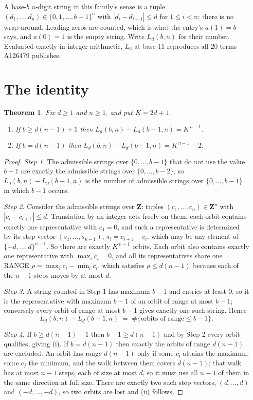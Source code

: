 \documentclass[11pt,a4paper]{article}
\theoremstyle{plain}
\newtheorem{theorem}{Theorem}
\theoremstyle{definition}
\begin{document}
A base-$b$ $n$-digit string in this family's sense is a tuple
$(d_1,\dots,d_n)\in\{0,1,\dots,b-1\}^{n}$ with $|d_i-d_{i+1}|\le d$ for $1\le i<n$; there
is no wrap-around. Leading zeros are counted, which is what the entry's $a(1)=b$ says, and
$a(0)=1$ is the empty string. Write $L_d(b,n)$ for their number. Evaluated exactly in integer
arithmetic, $L_{3}$ at base $11$ reproduces all $20$ terms A126479 publishes.

\section{The identity}

\begin{theorem}
Fix $d\ge1$ and $n\ge1$, and put $K=2d+1$.
\begin{enumerate}
\item[(i)] If $b\ge d(n-1)+1$ then $L_d(b,n)-L_d(b-1,n)=K^{\,n-1}$.
\item[(ii)] If $b=d(n-1)$ then $L_d(b,n)-L_d(b-1,n)=K^{\,n-1}-2$.
\end{enumerate}
\end{theorem}

\begin{proof}
\emph{Step 1.} The admissible strings over $\{0,\dots,b-1\}$ that do not use the value $b-1$
are exactly the admissible strings over $\{0,\dots,b-2\}$, so $L_d(b,n)-L_d(b-1,n)$ is the
number of admissible strings over $\{0,\dots,b-1\}$ in which $b-1$ occurs.

\emph{Step 2.} Consider the admissible strings over $\mathbf{Z}$: tuples
$(c_1,\dots,c_n)\in\mathbf{Z}^{n}$ with $|c_i-c_{i+1}|\le d$. Translation by an integer acts
freely on them, each orbit contains exactly one representative with $c_1=0$, and such a
representative is determined by its step vector $(s_1,\dots,s_{n-1})$, $s_i=c_{i+1}-c_i$,
which may be any element of $\{-d,\dots,d\}^{n-1}$. So there are exactly $K^{\,n-1}$ orbits.
Each orbit also contains exactly one representative with $\max_i c_i=0$, and all its
representatives share one RANGE $\rho=\max_ic_i-\min_ic_i$, which satisfies
$\rho\le d(n-1)$ because each of the $n-1$ steps moves by at most $d$.

\emph{Step 3.} A string counted in Step 1 has maximum $b-1$ and entries at least $0$, so it is
the representative with maximum $b-1$ of an orbit of range at most $b-1$; conversely every orbit
of range at most $b-1$ gives exactly one such string. Hence
\[
L_d(b,n)-L_d(b-1,n)\;=\;\#\{\text{orbits of range}\le b-1\} .
\]

\emph{Step 4.} If $b\ge d(n-1)+1$ then $b-1\ge d(n-1)$ and by Step 2 every orbit qualifies,
giving (i). If $b=d(n-1)$ then exactly the orbits of range $d(n-1)$ are excluded. An orbit has
range $d(n-1)$ only if some $c_i$ attains the maximum, some $c_j$ the minimum, and the walk
between them covers $d(n-1)$; that walk has at most $n-1$ steps, each of size at most $d$, so it
must use all $n-1$ of them in the same direction at full size. There are exactly two such step
vectors, $(d,\dots,d)$ and $(-d,\dots,-d)$, so two orbits are lost and (ii) follows.
\end{proof}
\end{document}
